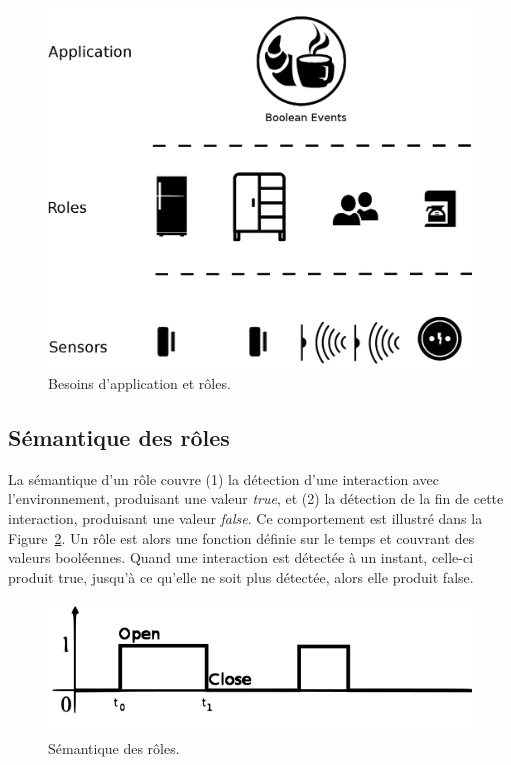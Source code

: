 \begin{figure}[!h]
  \centering
  \includegraphics[width=\linewidth,totalheight=\textheight,keepaspectratio]{gfx/Roles_etc.png}
  \caption{Besoins d'application et rôles.}
  \label{fig:appreqrole}
\end{figure}

\subsection{Sémantique des rôles}
La sémantique d'un rôle couvre (1) la détection d'une interaction avec 
l'environnement, produisant une valeur {\em true}, et (2) la détection de la fin 
de cette interaction, produisant une valeur {\em false}. Ce comportement est 
illustré dans la Figure~\ref{fig:semofroles}. Un rôle est alors une fonction 
définie sur le temps et couvrant des valeurs booléennes. Quand une interaction 
est détectée à un instant, celle-ci produit true, jusqu'à ce qu'elle ne soit 
plus détectée, alors elle produit false.

\begin{figure}[!h]
  \centering
      \includegraphics[width=\linewidth,totalheight=\textheight,keepaspectratio]{gfx/graph2.png}
      \caption{Sémantique des rôles.}
      \label{fig:semofroles}
\end{figure}

